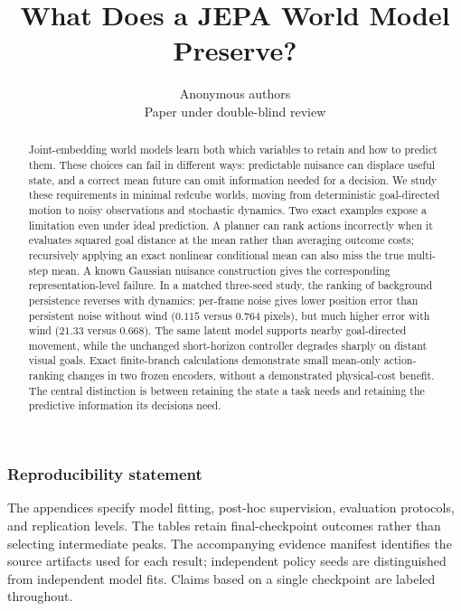 \documentclass{article}
\title{What Does a JEPA World Model Preserve?}
\author{Anonymous authors\\Paper under double-blind review}
\theoremstyle{remark}
\begin{document}
\maketitle
{}
\begin{abstract}
Joint-embedding world models learn both which variables to retain and how to predict them. These
choices can fail in different ways: predictable nuisance can displace useful state, and a correct
mean future can omit information needed for a decision. We study these requirements in minimal
redcube worlds, moving from deterministic goal-directed motion to noisy observations and stochastic
dynamics. Two exact examples expose a limitation even under ideal prediction. A planner can rank
actions incorrectly when it evaluates squared goal distance at the mean rather than averaging
outcome costs; recursively applying an exact nonlinear conditional mean can also miss the true
multi-step mean. A known Gaussian nuisance construction gives the corresponding representation-level
failure. In a matched three-seed study, the ranking of background persistence reverses with dynamics:
per-frame noise gives lower position error than persistent noise without wind ($0.115$ versus
$0.764$ pixels), but much higher error with wind ($21.33$ versus $0.668$).
The same latent model supports nearby goal-directed movement, while the unchanged
short-horizon controller degrades sharply on distant visual goals. Exact finite-branch calculations demonstrate small
mean-only action-ranking changes in two frozen encoders, without a demonstrated physical-cost
benefit. The central distinction
is between retaining the state a task needs and retaining the predictive information its decisions
need.
\end{abstract}








\subsubsection*{Reproducibility statement}
The appendices specify model fitting, post-hoc supervision,
evaluation protocols, and replication levels. The tables retain final-checkpoint outcomes rather
than selecting intermediate peaks. The accompanying evidence manifest identifies the source
artifacts used for each result; independent policy seeds are distinguished from independent model
fits. Claims based on a single checkpoint are labeled throughout.
\end{document}
